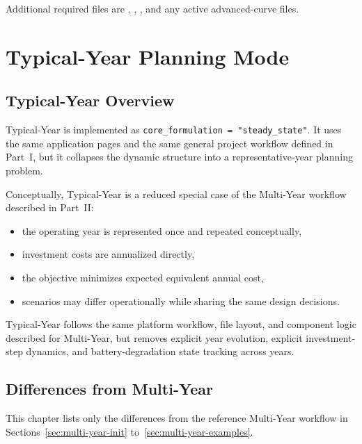 \documentclass[11pt,a4paper]{report}
\newcommand{\code}[1]{\texttt{#1}}
\begin{document}
Additional required files are , , , and any active advanced-curve files.

\part{Typical-Year Planning Mode}

\chapter{Typical-Year Overview}\label{sec:typical-overview}

Typical-Year is implemented as \code{core\_formulation = "steady\_state"}. It uses the same application pages and the same general project workflow defined in Part~I, but it collapses the dynamic structure into a representative-year planning problem.

Conceptually, Typical-Year is a reduced special case of the Multi-Year workflow described in Part~II:

\begin{itemize}[leftmargin=1.5em]
  \item the operating year is represented once and repeated conceptually,
  \item investment costs are annualized directly,
  \item the objective minimizes expected equivalent annual cost,
  \item scenarios may differ operationally while sharing the same design decisions.
\end{itemize}

\begin{guidenote}
Typical-Year follows the same platform workflow, file layout, and component logic described for Multi-Year, but removes explicit year evolution, explicit investment-step dynamics, and battery-degradation state tracking across years.
\end{guidenote}

\chapter{Differences from Multi-Year}\label{sec:typical-differences}

This chapter lists only the differences from the reference Multi-Year workflow in Sections~\ref{sec:multi-year-init} to~\ref{sec:multi-year-examples}.
\end{document}
